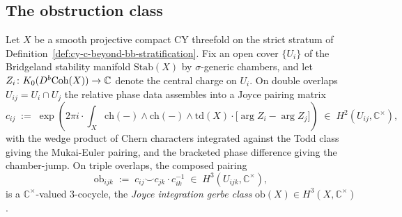 \subsection{The obstruction class}
\label{subsec:cy-c-beyond-joyce-obstruction-class}

\begin{definition}
\label{def:cy-c-beyond-joyce-gerbe}
Let $X$ be a smooth projective compact CY threefold on the strict stratum of
Definition~\ref{def:cy-c-beyond-bb-stratification}. Fix an open cover
$\{U_i\}$ of the Bridgeland stability manifold $\mathrm{Stab}(X)$ by
$\sigma$-generic chambers, and let
$Z_i \colon K_0(D^b\mathrm{Coh}(X)) \to \mathbb{C}$ denote the central charge on $U_i$.
On double overlaps $U_{ij} = U_i \cap U_j$ the relative phase data assembles
into a Joyce pairing matrix
\[
 c_{ij} \;:=\; \exp\!\left( 2\pi i \cdot \int_X \mathrm{ch}(-) \wedge \mathrm{ch}(-) \wedge \mathrm{td}(X)
 \cdot \bigl[\arg Z_i - \arg Z_j\bigr] \right) \;\in\; H^2(U_{ij}, \mathbb{C}^\times),
\]
with the wedge product of Chern characters integrated against the Todd class
giving the Mukai-Euler pairing, and the bracketed phase difference giving the
chamber-jump. On triple overlaps, the composed pairing
\[
 \mathrm{ob}_{ijk}
 \;:=\; c_{ij} \smile c_{jk} \cdot c_{ik}^{-1}
 \;\in\; H^3(U_{ijk}, \mathbb{C}^\times),
\]
is a $\mathbb{C}^\times$-valued $3$-cocycle, the \emph{Joyce integration gerbe
class} $\mathrm{ob}(X) \in H^3(X, \mathbb{C}^\times)$.
\end{definition}

